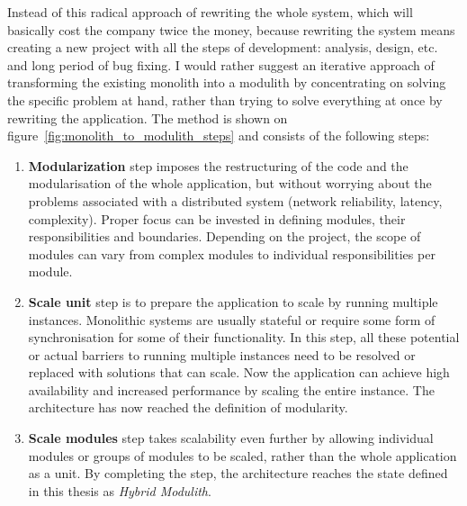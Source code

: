 Instead of this radical approach of rewriting the whole system, which will basically cost the company twice the money, because rewriting the system means creating a new project with all the steps of development: analysis, design, etc. and long period of bug fixing. I would rather suggest an iterative approach of transforming the existing monolith into a modulith by concentrating on solving the specific problem at hand, rather than trying to solve everything at once by rewriting the application. The method is shown on figure~\ref{fig:monolith_to_modulith_steps} and consists of the following steps:

\begin{enumerate}
    \item \textbf{Modularization} step imposes the restructuring of the code and the modularisation of the whole application, but without worrying about the problems associated with a distributed system (network reliability, latency, complexity). Proper focus can be invested in defining modules, their responsibilities and boundaries. Depending on the project, the scope of modules can vary from complex modules to individual responsibilities per module.
    \item \textbf{Scale unit} step is to prepare the application to scale by running multiple instances. Monolithic systems are usually stateful or require some form of synchronisation for some of their functionality. In this step, all these potential or actual barriers to running multiple instances need to be resolved or replaced with solutions that can scale. Now the application can achieve high availability and increased performance by scaling the entire instance. The architecture has now reached the definition of modularity.
    \item \textbf{Scale modules} step takes scalability even further by allowing individual modules or groups of modules to be scaled, rather than the whole application as a unit. By completing the step, the architecture reaches the state defined in this thesis as \textit{Hybrid Modulith}.
\end{enumerate}

